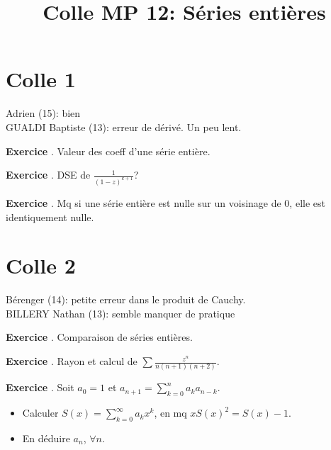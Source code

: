 \documentclass[10pt,a4paper]{article}
\title{Colle MP 12: Séries entières}
\newcounter{question}
\newcounter{exo}
\newenvironment{exo}{\vspace{0.5cm}\setcounter{question}{0}\addtocounter{exo}{1} \noindent \textbf{Exercice \theexo}. \normalsize }{\par}
\begin{document}
	\maketitle
	
	\section*{Colle 1}
	Adrien (15): bien\\
	GUALDI Baptiste (13): erreur de dérivé. Un peu lent.\\
		
	\begin{exo}
		Valeur des coeff d'une série entière.
	\end{exo}


	\begin{exo}
		DSE de $\frac{1}{(1-z)^{k+1}}$?
	\end{exo}
			
	\begin{exo}
		Mq si une série entière est nulle sur un voisinage de 0, elle est identiquement nulle.
	\end{exo}
	
	\section*{Colle 2}
	\setcounter{exo}{0}
	Bérenger (14): petite erreur dans le produit de Cauchy.\\
	BILLERY Nathan (13): semble manquer de pratique\\
	
	\begin{exo}
		Comparaison de séries entières.
	\end{exo}

	\begin{exo}
		Rayon et calcul de $\sum \frac{z^n}{n(n+1)(n+2)}$.
	\end{exo}

	\begin{exo}
		Soit $a_0 = 1$ et $a_{n+1} = \sum_{k=0}^{n} a_k a_{n-k}$.
		\begin{itemize}
			\item Calculer $S(x) = \sum_{k=0}^{\infty} a_k x^k$, en mq $xS(x)^2 = S(x) - 1$.
			\item En déduire $a_n$, $\forall n$.
		\end{itemize}
	\end{exo}
\end{document}
